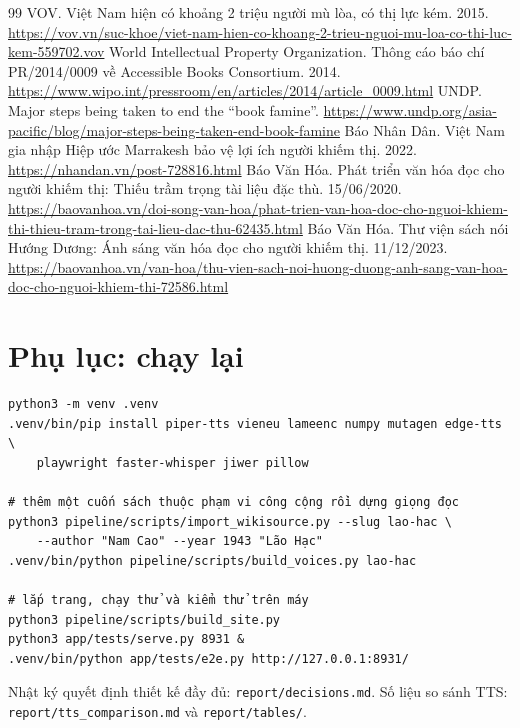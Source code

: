 \documentclass[12pt,a4paper]{article}
\begin{document}
\begin{thebibliography}{99}
 VOV. Việt Nam hiện có khoảng 2 triệu người mù lòa, có thị lực kém. 2015. \url{https://vov.vn/suc-khoe/viet-nam-hien-co-khoang-2-trieu-nguoi-mu-loa-co-thi-luc-kem-559702.vov}
 World Intellectual Property Organization. Thông cáo báo chí PR/2014/0009 về Accessible Books Consortium. 2014. \url{https://www.wipo.int/pressroom/en/articles/2014/article_0009.html}
 UNDP. Major steps being taken to end the ``book famine''. \url{https://www.undp.org/asia-pacific/blog/major-steps-being-taken-end-book-famine}
 Báo Nhân Dân. Việt Nam gia nhập Hiệp ước Marrakesh bảo vệ lợi ích người khiếm thị. 2022. \url{https://nhandan.vn/post-728816.html}
 Báo Văn Hóa. Phát triển văn hóa đọc cho người khiếm thị: Thiếu trầm trọng tài liệu đặc thù. 15/06/2020. \url{https://baovanhoa.vn/doi-song-van-hoa/phat-trien-van-hoa-doc-cho-nguoi-khiem-thi-thieu-tram-trong-tai-lieu-dac-thu-62435.html}
 Báo Văn Hóa. Thư viện sách nói Hướng Dương: Ánh sáng văn hóa đọc cho người khiếm thị. 11/12/2023. \url{https://baovanhoa.vn/van-hoa/thu-vien-sach-noi-huong-duong-anh-sang-van-hoa-doc-cho-nguoi-khiem-thi-72586.html}
\end{thebibliography}

\section*{Phụ lục: chạy lại}

\begin{verbatim}
python3 -m venv .venv
.venv/bin/pip install piper-tts vieneu lameenc numpy mutagen edge-tts \
    playwright faster-whisper jiwer pillow

# thêm một cuốn sách thuộc phạm vi công cộng rồi dựng giọng đọc
python3 pipeline/scripts/import_wikisource.py --slug lao-hac \
    --author "Nam Cao" --year 1943 "Lão Hạc"
.venv/bin/python pipeline/scripts/build_voices.py lao-hac

# lắp trang, chạy thử và kiểm thử trên máy
python3 pipeline/scripts/build_site.py
python3 app/tests/serve.py 8931 &
.venv/bin/python app/tests/e2e.py http://127.0.0.1:8931/
\end{verbatim}

Nhật ký quyết định thiết kế đầy đủ: \texttt{report/decisions.md}. Số liệu so sánh TTS: \texttt{report/tts\_comparison.md} và \texttt{report/tables/}.
\end{document}
